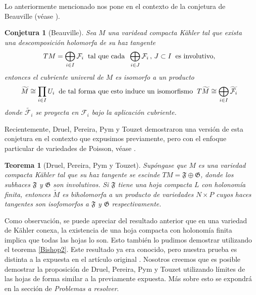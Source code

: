 \documentclass{article}
\newtheorem{teorema}{Teorema}[section]
\newtheorem{conjetura}{Conjetura}
\begin{document}
Lo anteriormente mencionado nos pone en el contexto de la conjetura de Beauville (v\'ease \cite{Beuville}).
\begin{conjetura}[Beauville]\label{Beauville}
        Sea $M$ una varidead compacta K\"ahler tal que exista una descomposici\'on holomorfa de su haz tangente
        \[
        TM=\bigoplus_{i\in I}\mathcal{F}_i\hspace{0.2cm}\text{tal que cada}\hspace{0.2cm}\bigoplus_{i\in J}\mathcal{F}_i\,,\,J\subset I\hspace{0.2cm}\text{es involutivo},
        \]
        entonces el cubriente univeral de $M$ es isomorfo a un producto 
        \[
        \widetilde{M}\cong\prod_{i\in I}U_i\hspace{0.2cm}\text{de tal forma que esto induce un isomorfismo}\hspace{0.2cm}T\widetilde{M}\cong\bigoplus_{i\in I}\widetilde{\mathcal{F}_i}
      \]
      donde $\widetilde{\mathcal{F}_{i}}$ se proyecta en $\mathcal{F}_{i}$ bajo la aplicaci\'on cubriente.
\end{conjetura}
Recientemente, Druel, Pereira, Pym y Touzet demostraron una versi\'on de esta conjetura en el contexto que expusimos previamente,
pero con el enfoque particular de variedades de Poisson, v\'ease \cite{DPPT}.
\begin{teorema}[Druel, Pereira, Pym y Touzet]\label{DPPT}
        Sup\'ongase que $M$ es una variedad compacta K\"ahler tal que su haz tangente se escinde $TM=\mathfrak{F}\oplus\mathfrak{G}$, donde
        los subhaces $\mathfrak{F}$ y $\mathfrak{G}$ son involutivos. Si $\mathfrak{F}$ tiene una hoja compacta $L$ con holonom\'ia finita,
        entonces $\widetilde{M}$ es biholomorfa a un producto de variedades $N\times P$ cuyos haces tangentes son isofomorfos
        a $\mathfrak{F}$ y $\mathfrak{G}$ respectivamente.
\end{teorema}
\noindent Como observaci\'on, se puede apreciar del resultado anterior que en una variedad de K\"ahler conexa, la existencia 
de una hoja compacta con holonom\'ia finita implica que todas las hojas lo son. Esto tambi\'en lo pudimos demostrar utilizando 
el teorema \ref{Bishop2}. Este resultado ya era conocido, pero nuestra prueba es distinta a la expuesta en el art\'iculo 
original \cite{Pereira}. 
Nosotros creemos que es posible demostrar la proposici\'on de Druel, Pereira, Pym y Touzet utilizando l\'imites de las hojas 
de forma similar a la previamente expuesta. M\'as sobre esto se expondr\'a en la secci\'on de \textit{Problemas a resolver}.
\end{document}
